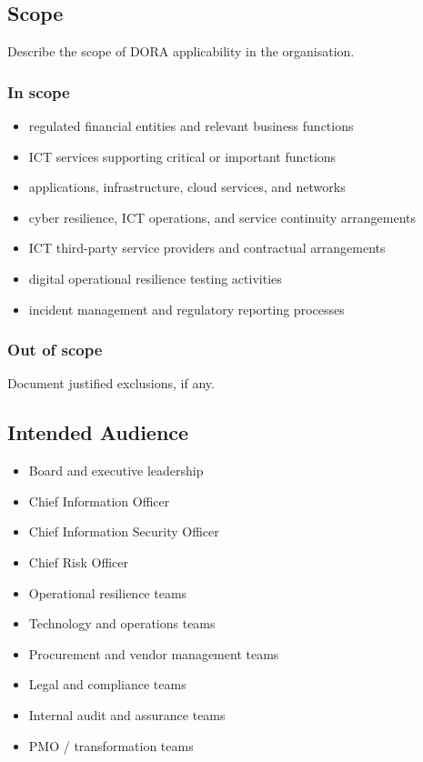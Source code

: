 \documentclass[
  letterpaper,
  DIV=11,
  numbers=noendperiod]{scrartcl}
\providecommand{\tightlist}{%
  \setlength{\itemsep}{0pt}\setlength{\parskip}{0pt}}
\begin{document}
\subsection{Scope}\label{scope}

Describe the scope of DORA applicability in the organisation.

\subsubsection{In scope}\label{in-scope}

\begin{itemize}
\tightlist
\item
  regulated financial entities and relevant business functions
\item
  ICT services supporting critical or important functions
\item
  applications, infrastructure, cloud services, and networks
\item
  cyber resilience, ICT operations, and service continuity arrangements
\item
  ICT third-party service providers and contractual arrangements
\item
  digital operational resilience testing activities
\item
  incident management and regulatory reporting processes
\end{itemize}

\subsubsection{Out of scope}\label{out-of-scope}

Document justified exclusions, if any.

\subsection{Intended Audience}\label{intended-audience}

\begin{itemize}
\tightlist
\item
  Board and executive leadership
\item
  Chief Information Officer
\item
  Chief Information Security Officer
\item
  Chief Risk Officer
\item
  Operational resilience teams
\item
  Technology and operations teams
\item
  Procurement and vendor management teams
\item
  Legal and compliance teams
\item
  Internal audit and assurance teams
\item
  PMO / transformation teams
\end{itemize}
\end{document}
